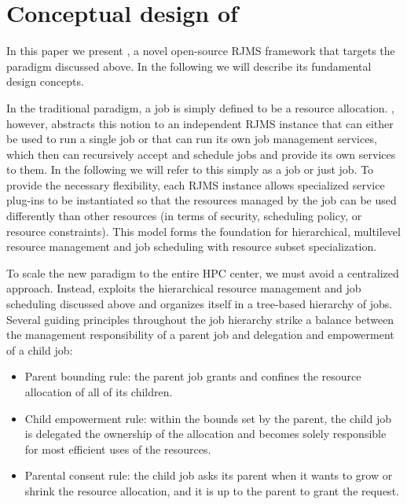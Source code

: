 \section{Conceptual design of \flux}
\label{models}

In this paper we present \flux, a novel open-source RJMS framework that
targets the paradigm discussed above. In the following
we will describe its
%
fundamental design
concepts.

\vspace{1ex}
 In the traditional paradigm, 
a job is simply defined to be a resource allocation. 
\flux, however, abstracts this notion to an independent 
RJMS instance that can either be used to run a single job
or that can 
run its own job management services,
which then can recursively accept and schedule jobs and provide its own 
services to them. 
In the following we will refer to this simply as a \flux job or just job.
To provide the necessary flexibility,
each RJMS instance 
allows specialized service
plug-ins to be instantiated so that the resources managed by the job
can be used differently than other resources (in terms of security, scheduling policy, or resource constraints).
This model forms 
the foundation for hierarchical,
multilevel resource management and job scheduling
with resource subset specialization.

\vspace{1ex}
 To scale the new paradigm 
to the entire HPC center, we must avoid a centralized approach. 
Instead, \flux exploits the hierarchical resource management 
and job scheduling discussed above and organizes itself in a tree-based hierarchy of \flux jobs. 
Several guiding principles throughout the job hierarchy strike 
a balance between the management responsibility 
of a parent job and delegation and empowerment of a child job:

\begin{itemize}
\item{Parent bounding rule: the parent job grants 
and confines the resource allocation of all of its children.}

\item{Child empowerment rule: within the bounds set 
by the parent, the child job is delegated the ownership 
of the allocation and becomes solely responsible 
for most efficient uses of the resources.}

\item{Parental consent rule: the child job asks 
its parent when it wants to grow or shrink the resource 
allocation, and it is up to the parent to grant the request.}
\end{itemize}

